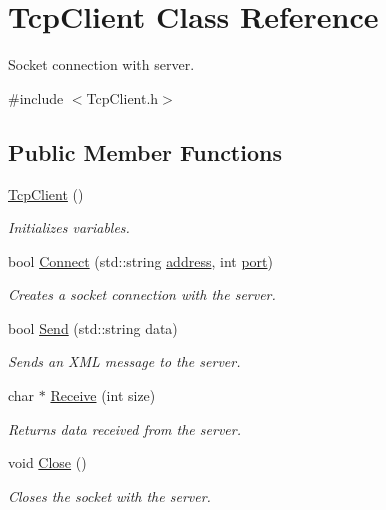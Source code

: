 \hypertarget{classTcpClient}{\section{Tcp\-Client Class Reference}
\label{classTcpClient}
}


Socket connection with server.  




{\ttfamily \#include $<$Tcp\-Client.\-h$>$}

\subsection*{Public Member Functions}
\begin{DoxyCompactItemize}
\item 
\hyperlink{classTcpClient_ad2e6b99a63964caa825c44e93ff8e777}{Tcp\-Client} ()
\begin{DoxyCompactList}\small\item\em Initializes variables. \end{DoxyCompactList}\item 
bool \hyperlink{classTcpClient_ac2e9bb63b4e0dc8f4508aa2a85431fe2}{Connect} (std\-::string \hyperlink{classTcpClient_a8bcb24ebf1d8e22e9185f3056fd108c4}{address}, int \hyperlink{classTcpClient_aa112ef0470437e790931b3ec9c98a800}{port})
\begin{DoxyCompactList}\small\item\em Creates a socket connection with the server. \end{DoxyCompactList}\item 
bool \hyperlink{classTcpClient_acac6ca70c9d99e09731181e5239381ae}{Send} (std\-::string data)
\begin{DoxyCompactList}\small\item\em Sends an X\-M\-L message to the server. \end{DoxyCompactList}\item 
char $\ast$ \hyperlink{classTcpClient_a83e87c3df7d1a5a27c075f9582c6350e}{Receive} (int size)
\begin{DoxyCompactList}\small\item\em Returns data received from the server. \end{DoxyCompactList}\item 
void \hyperlink{classTcpClient_ae7a96d69db612ef4827ee23c31332a4e}{Close} ()
\begin{DoxyCompactList}\small\item\em Closes the socket with the server. \end{DoxyCompactList}\end{DoxyCompactItemize}
